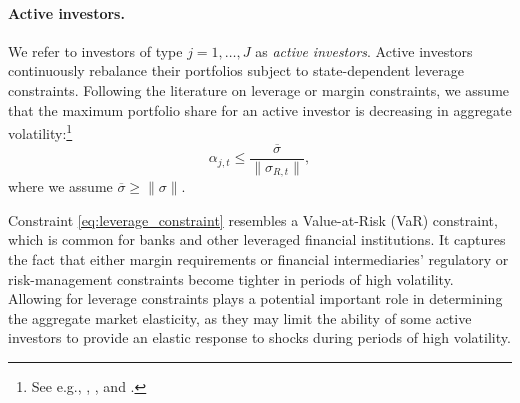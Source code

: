 

\paragraph{Active investors.} We refer to investors of type $j = 1,\ldots, J$ as \textit{active investors}. Active investors continuously rebalance their portfolios subject to state-dependent leverage constraints. Following the literature on leverage or margin constraints, we assume that the maximum portfolio share for an active investor is decreasing in aggregate volatility:\footnote{See e.g., \citet{brunnermeier2009market}, \citet{garleanu2011margin}, and \citet{adrian2014procyclical}.}
\begin{equation}\label{eq:leverage_constraint}
    \alpha_{j,t} \leq \frac{\overline{\sigma}}{\|\sigma_{R,t}\|},
\end{equation}
where we assume $\overline{\sigma} \geq \|\sigma\|$.

Constraint \eqref{eq:leverage_constraint} resembles a Value-at-Risk (VaR) constraint, which is common for banks and other leveraged financial institutions.
It captures the fact that either margin requirements or financial intermediaries' regulatory or risk-management constraints become tighter in periods of high volatility. 
Allowing for leverage constraints plays a potential important role in determining the aggregate market elasticity, as they may limit the ability of some active investors to provide an elastic response to shocks during periods of high volatility. 

